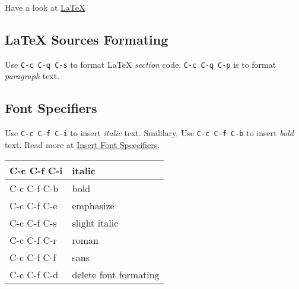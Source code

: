 Have a look at
\href{https://github.com/bigclean/blogs/blob/master/emacs/auctex.mkd}{\LaTeX{}}

\subsection{\LaTeX{} Sources Formating}
\label{sec:code-formating}

Use \verb|C-c C-q C-s| to format \LaTeX{} \textit{section}
code. \verb|C-c C-q C-p| is to format \textit{paragraph} text.

\subsection{Font Specifiers}
\label{sec:font-specifiers}

Use \verb|C-c C-f C-i| to insert \textit{italic} text. Smililary,
Use \verb|C-c C-f C-b| to insert \textit{bold} text. Read more at \href{https://www.gnu.org/software/auctex/manual/auctex/Font-Specifiers.html}{Insert Font Spcecifiers}.

\begin{center}
  \begin{tabular}{|l|l|}
    \hline{}
    C-c C-f C-i	& italic \\ \hline{}
    C-c C-f C-b & bold \\ \hline{}
    C-c C-f C-e & emphasize \\ \hline{}
    C-c C-f C-s & slight italic \\ \hline{}
    C-c C-f C-r & roman \\ \hline{}
    C-c C-f C-f & sans \\ \hline{}
    C-c C-f C-d & delete font formating \\ \hline
  \end{tabular}
\end{center}

